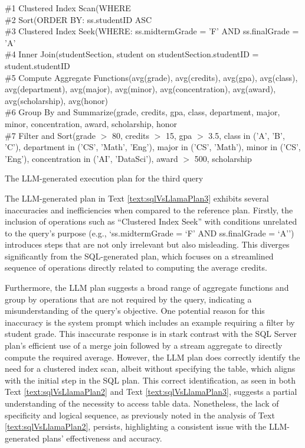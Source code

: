\begin{text}
  \raggedright
  \ContinuedFloat
  \#1 Clustered Index Scan(WHERE\\
  \#2 Sort(ORDER BY: ss.studentID ASC\\
  \#3 Clustered Index Seek(WHERE: ss.midtermGrade = 'F' AND ss.finalGrade = 'A'\\
  \#4 Inner Join(studentSection, student on studentSection.studentID = student.studentID\\
  \#5 Compute Aggregate Functions(avg(grade), avg(credits), avg(gpa), avg(class), avg(department), avg(major), avg(minor), avg(concentration), avg(award), avg(scholarship), avg(honor)\\
  \#6 Group By and Summarize(grade, credits, gpa, class, department, major, minor, concentration, award, scholarship, honor\\
  \#7 Filter and Sort(grade $>$ 80, credits $>$ 15, gpa $>$ 3.5, class in ('A', 'B', 'C'), department in ('CS', 'Math', 'Eng'), major in ('CS', 'Math'), minor in ('CS', 'Eng'), concentration in ('AI', 'DataSci'), award $>$ 500, scholarship
  \caption{The LLM-generated execution plan for the third query}
\end{text}

The LLM-generated plan in Text \ref{text:sqlVsLlamaPlan3} exhibits several inaccuracies and inefficiencies when compared to the reference plan. Firstly, the inclusion of operations such as ``Clustered Index Seek'' with conditions unrelated to the query's purpose (e.g., `ss.midtermGrade = `F' AND ss.finalGrade = `A'') introduces steps that are not only irrelevant but also misleading. This diverges significantly from the SQL-generated plan, which focuses on a streamlined sequence of operations directly related to computing the average credits.

Furthermore, the LLM plan suggests a broad range of aggregate functions and group by operations that are not required by the query, indicating a misunderstanding of the query's objective. One potential reason for this inaccuracy is the system prompt which includes an example requiring a filter by student grade. This inaccurate response is in stark contrast with the SQL Server plan's efficient use of a merge join followed by a stream aggregate to directly compute the required average. However, the LLM plan does correctly identify the need for a clustered index scan, albeit without specifying the table, which aligns with the initial step in the SQL plan. This correct identification, as seen in both Text \ref{text:sqlVsLlamaPlan2} and Text \ref{text:sqlVsLlamaPlan3}, suggests a partial understanding of the necessity to access table data. Nonetheless, the lack of specificity and logical sequence, as previously noted in the analysis of Text \ref{text:sqlVsLlamaPlan2}, persists, highlighting a consistent issue with the LLM-generated plans' effectiveness and accuracy.

